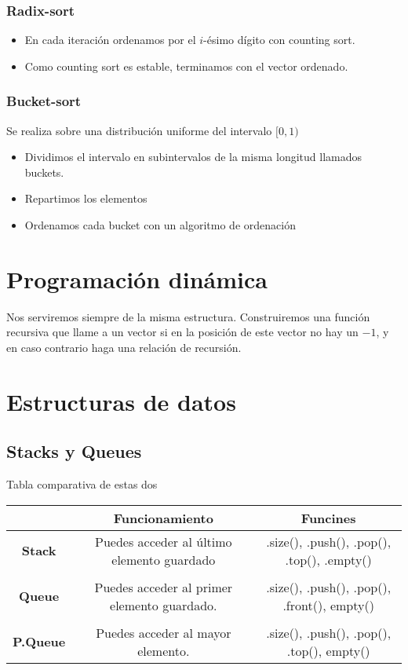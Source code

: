 \documentclass[leqno]{article}
\begin{document}
\subsubsection{Radix-sort}
\begin{itemize}
  \item En cada iteración ordenamos por el $i$-ésimo dígito con counting sort.
  \item Como counting sort es estable, terminamos con el vector ordenado.
\end{itemize}

\subsubsection{Bucket-sort}
Se realiza sobre una distribución uniforme del intervalo $[0, 1)$
\begin{itemize}
  \item Dividimos el intervalo en subintervalos de la misma longitud llamados buckets.
  \item Repartimos los elementos
  \item Ordenamos cada bucket con un algoritmo de ordenación
\end{itemize}

\section{Programación dinámica}
Nos serviremos siempre de la misma estructura. Construiremos una función recursiva que llame a un vector si en la posición de este vector no hay un $-1$, y en caso contrario haga una relación de recursión.



\section{Estructuras de datos}
\subsection{Stacks y Queues}
Tabla comparativa de estas dos
\begin{table}[h!]
    \centering
    \begin{tabular}{c|cc}
        & \textbf{Funcionamiento} & \textbf{Funcines} \\
        \hline
        \textbf{Stack} & Puedes acceder al último elemento guardado &  .size(), .push(), .pop(), .top(), .empty()\\
        \\
        \textbf{Queue} & Puedes acceder al primer elemento guardado.  & .size(), .push(), .pop(), .front(), empty() \\
        \\
        \textbf{P.Queue} & Puedes acceder al mayor elemento.  & .size(), .push(), .pop(), .top(), empty() \\
    \end{tabular}
\end{table}
\end{document}
